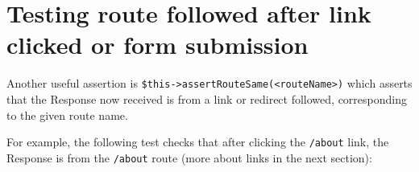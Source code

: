 \documentclass[a4paperpaper,openright]{book}
\newenvironment{Shaded}{}{}
\newcommand{\CommentTok}[1]{\textcolor[rgb]{0.38,0.63,0.69}{\textit{#1}}}
\newcommand{\FunctionTok}[1]{\textcolor[rgb]{0.02,0.16,0.49}{#1}}
\newcommand{\KeywordTok}[1]{\textcolor[rgb]{0.00,0.44,0.13}{\textbf{#1}}}
\newcommand{\NormalTok}[1]{#1}
\newcommand{\OtherTok}[1]{\textcolor[rgb]{0.00,0.44,0.13}{#1}}
\newcommand{\StringTok}[1]{\textcolor[rgb]{0.25,0.44,0.63}{#1}}
\begin{document}
\hypertarget{testing-route-followed-after-link-clicked-or-form-submission}{%
\section{Testing route followed after link clicked or form
submission}\label{testing-route-followed-after-link-clicked-or-form-submission}}

Another useful assertion is
\texttt{\$this-\textgreater{}assertRouteSame(\textless{}routeName\textgreater{})}
which asserts that the Response now received is from a link or redirect
followed, corresponding to the given route name.

For example, the following test checks that after clicking the
\texttt{/about} link, the Response is from the \texttt{/about} route
(more about links in the next section):

\begin{Shaded}
\end{Shaded}
\end{document}
